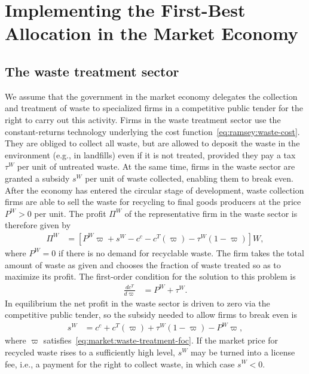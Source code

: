 \section{Implementing the First-Best Allocation in the Market Economy}
\label{sec:market-implementation}

\subsection{The waste treatment sector}
\label{subsec:market-implementation:waste-sector}

We assume that the government in the market economy delegates the collection and treatment of waste to specialized firms in a competitive public tender for the right to carry out this activity. Firms in the waste treatment sector use the constant-returns technology underlying the cost function~\eqref{eq:ramsey:waste-cost}. They are obliged to collect all waste, but are allowed to deposit the waste in the environment (e.g., in landfills) even if it is not treated, provided they pay a tax $\tau^W$ per unit of untreated waste. At the same time, firms in the waste sector are granted a subsidy $s^W$ per unit of waste collected, enabling them to break even. After the economy has entered the circular stage of development, waste collection firms are able to sell the waste for recycling to final goods producers at the price $P^W>0$ per unit. The profit $\Pi^W$ of the representative firm in the waste sector is therefore given by
\begin{align}
\Pi^W &= \left[P^W\varpi + s^W - c^c - c^T(\varpi) - \tau^W(1-\varpi)\right]W,
\label{eq:market:waste-profit}
\end{align}
where $P^W=0$ if there is no demand for recyclable waste. The firm takes the total amount of waste as given and chooses the fraction of waste treated so as to maximize its profit. The first-order condition for the solution to this problem is
\begin{align}
\frac{dc^T}{d\varpi} &= P^W + \tau^W.
\label{eq:market:waste-treatment-foc}
\end{align}
In equilibrium the net profit in the waste sector is driven to zero via the competitive public tender, so the subsidy needed to allow firms to break even is
\begin{align}
s^W &= c^c + c^T(\varpi) + \tau^W(1-\varpi) - P^W\varpi,
\label{eq:market:waste-subsidy-zero-profit}
\end{align}
where $\varpi$ satisfies~\eqref{eq:market:waste-treatment-foc}. If the market price for recycled waste rises to a sufficiently high level, $s^W$ may be turned into a license fee, i.e., a payment for the right to collect waste, in which case $s^W<0$.

